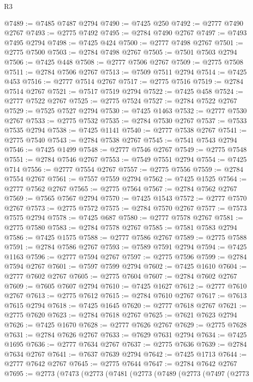 \begin{lexlean}{R3}
\begin{coremodule}
@7489 := @7485 @7487 @2794
@7490 := @7425 @250
@7492 := @2777 @7490 @2767
@7493 := @2775 @7492
@7495 := @2784 @7490 @2767
@7497 := @7493 @7495 @2794
@7498 := @7425 @424
@7500 := @2777 @7498 @2767
@7501 := @2775 @7500
@7503 := @2784 @7498 @2767
@7505 := @7501 @7503 @2794
@7506 := @7425 @448
@7508 := @2777 @7506 @2767
@7509 := @2775 @7508
@7511 := @2784 @7506 @2767
@7513 := @7509 @7511 @2794
@7514 := @7425 @453
@7516 := @2777 @7514 @2767
@7517 := @2775 @7516
@7519 := @2784 @7514 @2767
@7521 := @7517 @7519 @2794
@7522 := @7425 @458
@7524 := @2777 @7522 @2767
@7525 := @2775 @7524
@7527 := @2784 @7522 @2767
@7529 := @7525 @7527 @2794
@7530 := @7425 @1463
@7532 := @2777 @7530 @2767
@7533 := @2775 @7532
@7535 := @2784 @7530 @2767
@7537 := @7533 @7535 @2794
@7538 := @7425 @1141
@7540 := @2777 @7538 @2767
@7541 := @2775 @7540
@7543 := @2784 @7538 @2767
@7545 := @7541 @7543 @2794
@7546 := @7425 @1499
@7548 := @2777 @7546 @2767
@7549 := @2775 @7548
@7551 := @2784 @7546 @2767
@7553 := @7549 @7551 @2794
@7554 := @7425 @714
@7556 := @2777 @7554 @2767
@7557 := @2775 @7556
@7559 := @2784 @7554 @2767
@7561 := @7557 @7559 @2794
@7562 := @7425 @1525
@7564 := @2777 @7562 @2767
@7565 := @2775 @7564
@7567 := @2784 @7562 @2767
@7569 := @7565 @7567 @2794
@7570 := @7425 @1543
@7572 := @2777 @7570 @2767
@7573 := @2775 @7572
@7575 := @2784 @7570 @2767
@7577 := @7573 @7575 @2794
@7578 := @7425 @687
@7580 := @2777 @7578 @2767
@7581 := @2775 @7580
@7583 := @2784 @7578 @2767
@7585 := @7581 @7583 @2794
@7586 := @7425 @1575
@7588 := @2777 @7586 @2767
@7589 := @2775 @7588
@7591 := @2784 @7586 @2767
@7593 := @7589 @7591 @2794
@7594 := @7425 @1163
@7596 := @2777 @7594 @2767
@7597 := @2775 @7596
@7599 := @2784 @7594 @2767
@7601 := @7597 @7599 @2794
@7602 := @7425 @1610
@7604 := @2777 @7602 @2767
@7605 := @2775 @7604
@7607 := @2784 @7602 @2767
@7609 := @7605 @7607 @2794
@7610 := @7425 @1627
@7612 := @2777 @7610 @2767
@7613 := @2775 @7612
@7615 := @2784 @7610 @2767
@7617 := @7613 @7615 @2794
@7618 := @7425 @1645
@7620 := @2777 @7618 @2767
@7621 := @2775 @7620
@7623 := @2784 @7618 @2767
@7625 := @7621 @7623 @2794
@7626 := @7425 @1670
@7628 := @2777 @7626 @2767
@7629 := @2775 @7628
@7631 := @2784 @7626 @2767
@7633 := @7629 @7631 @2794
@7634 := @7425 @1695
@7636 := @2777 @7634 @2767
@7637 := @2775 @7636
@7639 := @2784 @7634 @2767
@7641 := @7637 @7639 @2794
@7642 := @7425 @1713
@7644 := @2777 @7642 @2767
@7645 := @2775 @7644
@7647 := @2784 @7642 @2767
@7695 := @2773
    (@7473
      (@2773
        (@7481
          (@2773
            (@7489
              (@2773
                (@7497
                  (@2773

\end{coremodule}
\end{lexlean}
